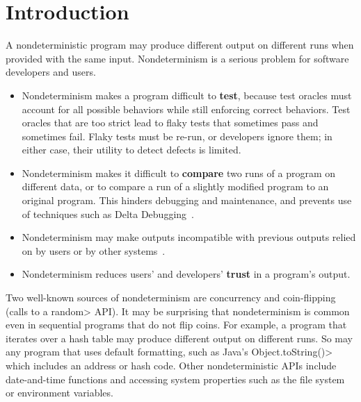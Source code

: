 \section{Introduction}

A nondeterministic program may produce different output on different runs
when provided with the same input.
Nondeterminism is a serious problem for software developers and users.
\begin{itemize}
\item
  Nondeterminism makes a program difficult to \textbf{test}, because test
  oracles must account for all possible behaviors while still enforcing
  correct behaviors.  Test oracles that are too strict lead to flaky tests
  that sometimes pass and sometimes fail.  Flaky tests must be re-run, or
  developers ignore them; in either case, their utility to detect defects
  is limited.
\item
  Nondeterminism makes it difficult to \textbf{compare} two runs of a
  program on different data, or to compare a run of a slightly modified
  program to an original program.  This hinders debugging and maintenance,
  and prevents use of techniques such as Delta Debugging~\cite{Zeller1999}.
\item
  Nondeterminism may make outputs incompatible with previous outputs relied
  on by users or by other systems~\cite{Herzig:2015:EDF:2819009.2819018,Huo:2014:IOQ:2635868.2635917,Zhang:2014:ERT:2610384.2610404,BellKMD2015,Fowler,Gyori:2015:RTD:2771783.2771793,Dan:2013:10.1007/978-3-642-39038-8_25,Vahabzadeh:2015:7332456,Sudarshan}.
\item
  Nondeterminism reduces users' and developers' \textbf{trust} in a program's output.
\end{itemize}

Two well-known sources of nondeterminism are concurrency
and coin-flipping
(calls to a \<random> API\@).
It may be surprising that nondeterminism is common even in sequential
programs that do not flip coins.
For example, a program that iterates over a hash table
may produce different output on different runs.
So may any program that uses default formatting, such as Java's
\<Object.toString()> which includes an address or hash code.
Other nondeterministic APIs include date-and-time functions and
accessing system properties such as the file system or environment variables.

